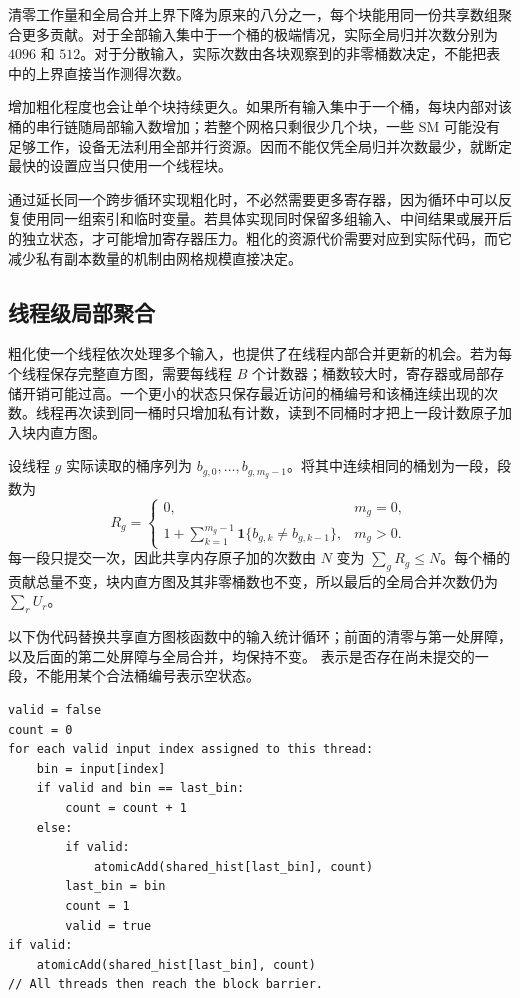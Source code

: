 清零工作量和全局合并上界下降为原来的八分之一，每个块能用同一份共享数组聚合更多贡献。对于全部输入集中于一个桶的极端情况，实际全局归并次数分别为 $4096$ 和 $512$。对于分散输入，实际次数由各块观察到的非零桶数决定，不能把表中的上界直接当作测得次数。

增加粗化程度也会让单个块持续更久。如果所有输入集中于一个桶，每块内部对该桶的串行链随局部输入数增加；若整个网格只剩很少几个块，一些 SM 可能没有足够工作，设备无法利用全部并行资源。因而不能仅凭全局归并次数最少，就断定最快的设置应当只使用一个线程块。

通过延长同一个跨步循环实现粗化时，不必然需要更多寄存器，因为循环中可以反复使用同一组索引和临时变量。若具体实现同时保留多组输入、中间结果或展开后的独立状态，才可能增加寄存器压力。粗化的资源代价需要对应到实际代码，而它减少私有副本数量的机制由网格规模直接决定。

\subsection{线程级局部聚合}

粗化使一个线程依次处理多个输入，也提供了在线程内部合并更新的机会。若为每个线程保存完整直方图，需要每线程 $B$ 个计数器；桶数较大时，寄存器或局部存储开销可能过高。一个更小的状态只保存最近访问的桶编号和该桶连续出现的次数。线程再次读到同一桶时只增加私有计数，读到不同桶时才把上一段计数原子加入块内直方图。

设线程 $g$ 实际读取的桶序列为 $b_{g,0},\ldots,b_{g,m_g-1}$。将其中连续相同的桶划为一段，段数为
\begin{equation}
R_g=\begin{cases}
0,&m_g=0,\\
1+\displaystyle\sum_{k=1}^{m_g-1}\mathbf{1}\{b_{g,k}\ne b_{g,k-1}\},&m_g>0.
\end{cases}
\label{l13:eq:runs}
\end{equation}
每一段只提交一次，因此共享内存原子加的次数由 $N$ 变为 $\sum_g R_g\le N$。每个桶的贡献总量不变，块内直方图及其非零桶数也不变，所以最后的全局合并次数仍为 $\sum_r U_r$。

以下伪代码替换共享直方图核函数中的输入统计循环；前面的清零与第一处屏障，以及后面的第二处屏障与全局合并，均保持不变。\mbox{} 表示是否存在尚未提交的一段，不能用某个合法桶编号表示空状态。

\noindent\begin{minipage}{\textwidth}
\begin{lstlisting}[caption={线程内合并连续同桶更新的伪代码},label={l13:lst:aggregate},language={}]
valid = false
count = 0
for each valid input index assigned to this thread:
    bin = input[index]
    if valid and bin == last_bin:
        count = count + 1
    else:
        if valid:
            atomicAdd(shared_hist[last_bin], count)
        last_bin = bin
        count = 1
        valid = true
if valid:
    atomicAdd(shared_hist[last_bin], count)
// All threads then reach the block barrier.
\end{lstlisting}
\end{minipage}

